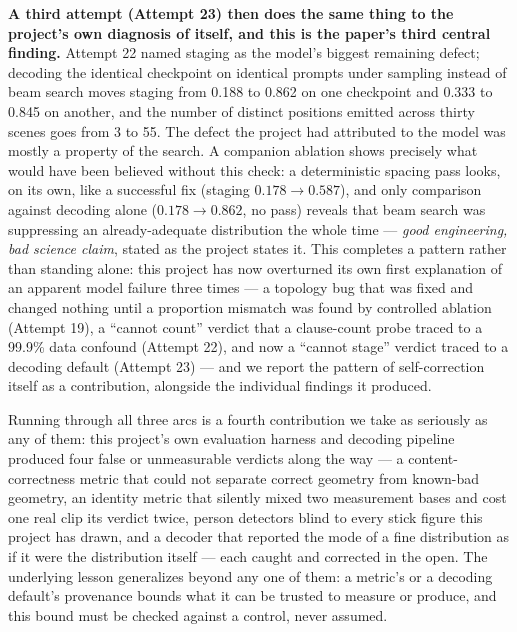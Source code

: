 \documentclass[11pt]{article}
\begin{document}
\textbf{A third attempt (Attempt 23) then does the same thing to the
project's own diagnosis of itself, and this is the paper's third central
finding.} Attempt 22 named staging as the model's biggest remaining
defect; decoding the identical checkpoint on identical prompts under
sampling instead of beam search moves staging from 0.188 to 0.862 on one
checkpoint and 0.333 to 0.845 on another, and the number of distinct
positions emitted across thirty scenes goes from 3 to 55. The defect the
project had attributed to the model was mostly a property of the search.
A companion ablation shows precisely what would have been believed
without this check: a deterministic spacing pass looks, on its own, like
a successful fix (staging $0.178 \rightarrow 0.587$), and only comparison
against decoding alone ($0.178 \rightarrow 0.862$, no pass) reveals that
beam search was suppressing an already-adequate distribution the whole
time --- \emph{good engineering, bad science claim}, stated as the
project states it. This completes a pattern rather than standing alone:
this project has now overturned its own first explanation of an apparent
model failure three times --- a topology bug that was fixed and changed
nothing until a proportion mismatch was found by controlled ablation
(Attempt 19), a ``cannot count'' verdict that a clause-count probe traced
to a 99.9\% data confound (Attempt 22), and now a ``cannot stage''
verdict traced to a decoding default (Attempt 23) --- and we report the
pattern of self-correction itself as a contribution, alongside the
individual findings it produced.

Running through all three arcs is a fourth contribution we take as
seriously as any of them: this project's own evaluation harness and
decoding pipeline produced four false or unmeasurable verdicts along the
way --- a content-correctness metric that could not separate correct
geometry from known-bad geometry, an identity metric that silently mixed
two measurement bases and cost one real clip its verdict twice, person
detectors blind to every stick figure this project has drawn, and a
decoder that reported the mode of a fine distribution as if it were the
distribution itself --- each caught and corrected in the open. The
underlying lesson generalizes beyond any one of them: a metric's or a
decoding default's provenance bounds what it can be trusted to measure or
produce, and this bound must be checked against a control, never assumed.
\end{document}
